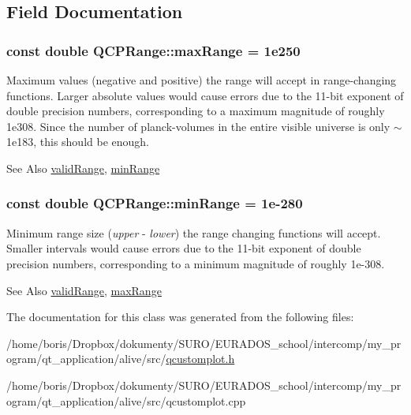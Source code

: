 \subsection{Field Documentation}
\hypertarget{classQCPRange_a5ca51e7a2dc5dc0d49527ab171fe1f4f}{
\subsubsection[{max\-Range}]{\setlength{\rightskip}{0pt plus 5cm}const double Q\-C\-P\-Range\-::max\-Range = 1e250\hspace{0.3cm}{\ttfamily [static]}}}\label{classQCPRange_a5ca51e7a2dc5dc0d49527ab171fe1f4f}
Maximum values (negative and positive) the range will accept in range-\/changing functions. Larger absolute values would cause errors due to the 11-\/bit exponent of double precision numbers, corresponding to a maximum magnitude of roughly 1e308. Since the number of planck-\/volumes in the entire visible universe is only $\sim$1e183, this should be enough. \begin{DoxySeeAlso}{See Also}
\hyperlink{classQCPRange_ab38bd4841c77c7bb86c9eea0f142dcc0}{valid\-Range}, \hyperlink{classQCPRange_ab46d3bc95030ee25efda41b89e2b616b}{min\-Range} 
\end{DoxySeeAlso}
\hypertarget{classQCPRange_ab46d3bc95030ee25efda41b89e2b616b}{
\subsubsection[{min\-Range}]{\setlength{\rightskip}{0pt plus 5cm}const double Q\-C\-P\-Range\-::min\-Range = 1e-\/280\hspace{0.3cm}{\ttfamily [static]}}}\label{classQCPRange_ab46d3bc95030ee25efda41b89e2b616b}
Minimum range size ({\itshape upper} -\/ {\itshape lower}) the range changing functions will accept. Smaller intervals would cause errors due to the 11-\/bit exponent of double precision numbers, corresponding to a minimum magnitude of roughly 1e-\/308. \begin{DoxySeeAlso}{See Also}
\hyperlink{classQCPRange_ab38bd4841c77c7bb86c9eea0f142dcc0}{valid\-Range}, \hyperlink{classQCPRange_a5ca51e7a2dc5dc0d49527ab171fe1f4f}{max\-Range} 
\end{DoxySeeAlso}


The documentation for this class was generated from the following files\-:\begin{DoxyCompactItemize}
\item 
/home/boris/\-Dropbox/dokumenty/\-S\-U\-R\-O/\-E\-U\-R\-A\-D\-O\-S\-\_\-school/intercomp/my\-\_\-program/qt\-\_\-application/alive/src/\hyperlink{qcustomplot_8h}{qcustomplot.\-h}\item 
/home/boris/\-Dropbox/dokumenty/\-S\-U\-R\-O/\-E\-U\-R\-A\-D\-O\-S\-\_\-school/intercomp/my\-\_\-program/qt\-\_\-application/alive/src/qcustomplot.\-cpp\end{DoxyCompactItemize}
